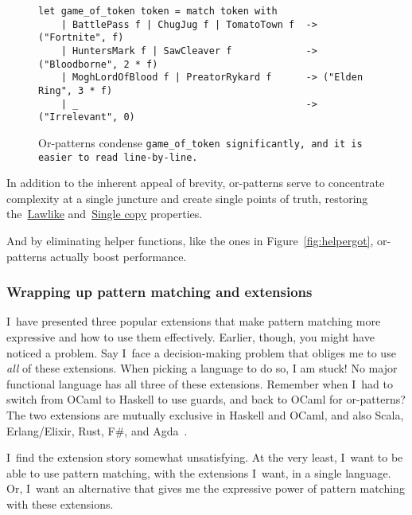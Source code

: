 \documentclass[manuscript,screen,review, 12pt, nonacm]{acmart}
\begin{document}
    \begin{figure}
    \begin{center}
    \begin{verbatim}
let game_of_token token = match token with 
    | BattlePass f | ChugJug f | TomatoTown f  -> ("Fortnite", f)
    | HuntersMark f | SawCleaver f             -> ("Bloodborne", 2 * f)
    | MoghLordOfBlood f | PreatorRykard f      -> ("Elden Ring", 3 * f)
    | _                                        -> ("Irrelevant", 0)
    \end{verbatim}
    \end{center}    
    \caption{Or-patterns condense \tt{game\_of\_token}
    significantly, and it is easier to read line-by-line.} 
    \label{fig:orgot}
    \end{figure}

    In addition to the inherent appeal of brevity, or-patterns serve to
    concentrate complexity at a single juncture and create single points of
    truth, restoring the~\hyperref[p1]{Lawlike} and~\hyperref[p2]{Single copy}
    properties. 
    
    And by eliminating helper functions, like the ones in
    Figure~\ref{fig:helpergot}, or-patterns actually boost performance.
      
    \subsubsection{Wrapping up pattern matching and extensions}
    
    I~have presented three popular extensions that make pattern matching more
    expressive and how to use them effectively. Earlier, though, you might have
    noticed a problem. Say I~face a decision-making problem that obliges me to
    use \emph{all} of these extensions. When picking a language to do so, I am
    stuck! No major functional language has all three of these extensions.
    Remember when I~had to switch from OCaml to Haskell to use guards, and back
    to OCaml for or-patterns? The two extensions are mutually exclusive in
    Haskell and OCaml, and also Scala, Erlang/Elixir, Rust, F\#, and
    Agda~\citep{haskell, ocaml, scala, erlang, elixir, rust, fsharp, agda}. 


    I~find the extension story somewhat unsatisfying. At the very least, I~want
    to be able to use pattern matching, with the extensions I~want, in a single
    language. Or, I~want an alternative that gives me the expressive power of
    pattern matching with these extensions. 
\end{document}

